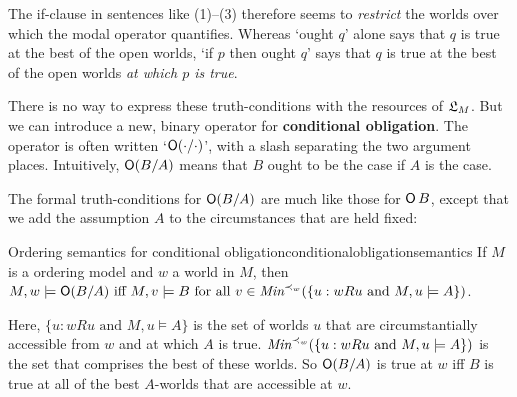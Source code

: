 The if-clause in sentences like (1)--(3) therefore seems to \emph{restrict} the
worlds over which the modal operator quantifies. Whereas `ought $q$' alone says
that $q$ is true at the best of the open worlds, `if $p$ then ought $q$' says
that $q$ is true at the best of the open worlds \emph{at which $p$ is true}.

There is no way to express these truth-conditions with the resources of $\mathfrak{L}_M$.
But we can introduce a new, binary operator for \textbf{conditional obligation}.
The operator is often written `$\operatorname{\mathsf{O}}(\cdot/\cdot)$', with a slash separating the
two argument places. Intuitively, $\operatorname{\mathsf{O}}(B/A)$ means that $B$ ought to be the
case if $A$ is the case.





The formal truth-conditions for $\operatorname{\mathsf{O}}(B/A)$ are much like those for $\operatorname{\mathsf{O}} B$, except
that we add the assumption $A$ to the circumstances that are held fixed:

\begin{definition}{Ordering semantics for conditional obligation}{conditionalobligationsemantics}
  If $M$ is a ordering model and $w$ a world in $M$, then\\[1mm]
$M,w \models \Ob (B/A) \text{ iff $M,v \models B$ for all
  $v \in \emph{Min}^{\prec_w}(\{ u: wRu \text{ and } M,u\models A \})$}$.
\end{definition}
%
\noindent%
Here, $\{ u: wRu \text{ and } M,u\models A \}$ is the set of worlds $u$ that are
circumstantially accessible from $w$ and at which $A$ is true.
$\emph{Min}^{\prec_{w}}(\{ u: wRu \text{ and } M,u\models A \})$ is the set that
comprises the best of these worlds. So $\operatorname{\mathsf{O}}(B/A)$ is true at $w$ iff $B$ is true
at all of the best $A$-worlds that are accessible at $w$.

